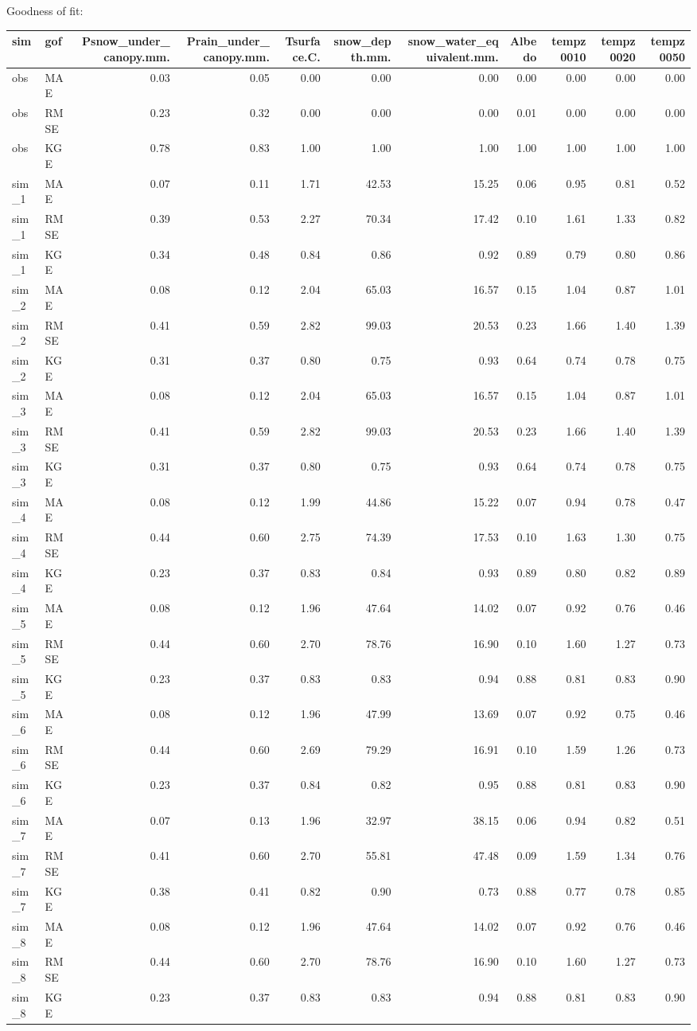 \documentclass[
]{article}
\begin{document}
Goodness of fit:

\begin{longtable}[]{@{}llrrrrrrrrr@{}}
\toprule
sim & gof & Psnow\_under\_canopy.mm. & Prain\_under\_canopy.mm. &
Tsurface.C. & snow\_depth.mm. & snow\_water\_equivalent.mm. & Albedo &
tempz0010 & tempz0020 & tempz0050\tabularnewline
\midrule
\endhead
obs & MAE & 0.03 & 0.05 & 0.00 & 0.00 & 0.00 & 0.00 & 0.00 & 0.00 &
0.00\tabularnewline
obs & RMSE & 0.23 & 0.32 & 0.00 & 0.00 & 0.00 & 0.01 & 0.00 & 0.00 &
0.00\tabularnewline
obs & KGE & 0.78 & 0.83 & 1.00 & 1.00 & 1.00 & 1.00 & 1.00 & 1.00 &
1.00\tabularnewline
sim\_1 & MAE & 0.07 & 0.11 & 1.71 & 42.53 & 15.25 & 0.06 & 0.95 & 0.81 &
0.52\tabularnewline
sim\_1 & RMSE & 0.39 & 0.53 & 2.27 & 70.34 & 17.42 & 0.10 & 1.61 & 1.33
& 0.82\tabularnewline
sim\_1 & KGE & 0.34 & 0.48 & 0.84 & 0.86 & 0.92 & 0.89 & 0.79 & 0.80 &
0.86\tabularnewline
sim\_2 & MAE & 0.08 & 0.12 & 2.04 & 65.03 & 16.57 & 0.15 & 1.04 & 0.87 &
1.01\tabularnewline
sim\_2 & RMSE & 0.41 & 0.59 & 2.82 & 99.03 & 20.53 & 0.23 & 1.66 & 1.40
& 1.39\tabularnewline
sim\_2 & KGE & 0.31 & 0.37 & 0.80 & 0.75 & 0.93 & 0.64 & 0.74 & 0.78 &
0.75\tabularnewline
sim\_3 & MAE & 0.08 & 0.12 & 2.04 & 65.03 & 16.57 & 0.15 & 1.04 & 0.87 &
1.01\tabularnewline
sim\_3 & RMSE & 0.41 & 0.59 & 2.82 & 99.03 & 20.53 & 0.23 & 1.66 & 1.40
& 1.39\tabularnewline
sim\_3 & KGE & 0.31 & 0.37 & 0.80 & 0.75 & 0.93 & 0.64 & 0.74 & 0.78 &
0.75\tabularnewline
sim\_4 & MAE & 0.08 & 0.12 & 1.99 & 44.86 & 15.22 & 0.07 & 0.94 & 0.78 &
0.47\tabularnewline
sim\_4 & RMSE & 0.44 & 0.60 & 2.75 & 74.39 & 17.53 & 0.10 & 1.63 & 1.30
& 0.75\tabularnewline
sim\_4 & KGE & 0.23 & 0.37 & 0.83 & 0.84 & 0.93 & 0.89 & 0.80 & 0.82 &
0.89\tabularnewline
sim\_5 & MAE & 0.08 & 0.12 & 1.96 & 47.64 & 14.02 & 0.07 & 0.92 & 0.76 &
0.46\tabularnewline
sim\_5 & RMSE & 0.44 & 0.60 & 2.70 & 78.76 & 16.90 & 0.10 & 1.60 & 1.27
& 0.73\tabularnewline
sim\_5 & KGE & 0.23 & 0.37 & 0.83 & 0.83 & 0.94 & 0.88 & 0.81 & 0.83 &
0.90\tabularnewline
sim\_6 & MAE & 0.08 & 0.12 & 1.96 & 47.99 & 13.69 & 0.07 & 0.92 & 0.75 &
0.46\tabularnewline
sim\_6 & RMSE & 0.44 & 0.60 & 2.69 & 79.29 & 16.91 & 0.10 & 1.59 & 1.26
& 0.73\tabularnewline
sim\_6 & KGE & 0.23 & 0.37 & 0.84 & 0.82 & 0.95 & 0.88 & 0.81 & 0.83 &
0.90\tabularnewline
sim\_7 & MAE & 0.07 & 0.13 & 1.96 & 32.97 & 38.15 & 0.06 & 0.94 & 0.82 &
0.51\tabularnewline
sim\_7 & RMSE & 0.41 & 0.60 & 2.70 & 55.81 & 47.48 & 0.09 & 1.59 & 1.34
& 0.76\tabularnewline
sim\_7 & KGE & 0.38 & 0.41 & 0.82 & 0.90 & 0.73 & 0.88 & 0.77 & 0.78 &
0.85\tabularnewline
sim\_8 & MAE & 0.08 & 0.12 & 1.96 & 47.64 & 14.02 & 0.07 & 0.92 & 0.76 &
0.46\tabularnewline
sim\_8 & RMSE & 0.44 & 0.60 & 2.70 & 78.76 & 16.90 & 0.10 & 1.60 & 1.27
& 0.73\tabularnewline
sim\_8 & KGE & 0.23 & 0.37 & 0.83 & 0.83 & 0.94 & 0.88 & 0.81 & 0.83 &
0.90\tabularnewline
\bottomrule
\end{longtable}
\end{document}
